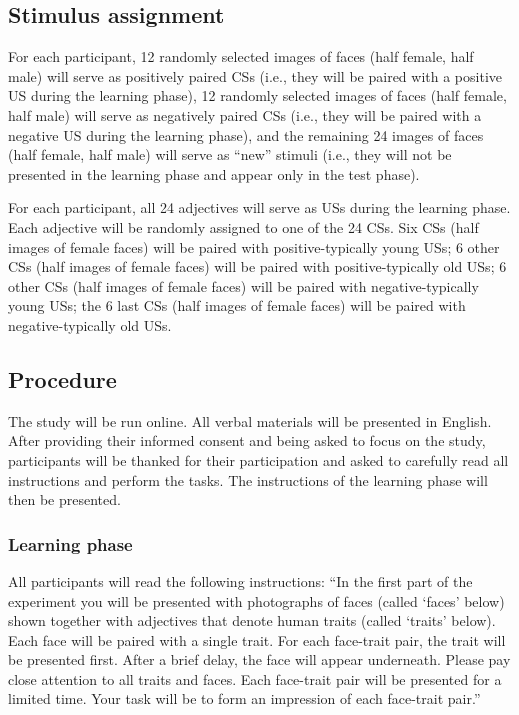 \documentclass[
  doc,floatsintext]{apa6}
\begin{document}
\subsection{Stimulus assignment}\label{stimulus-assignment}

For each participant, 12 randomly selected images of faces (half female, half male) will serve as positively paired CSs (i.e., they will be paired with a positive US during the learning phase), 12 randomly selected images of faces (half female, half male) will serve as negatively paired CSs (i.e., they will be paired with a negative US during the learning phase), and the remaining 24 images of faces (half female, half male) will serve as ``new'' stimuli (i.e., they will not be presented in the learning phase and appear only in the test phase).

For each participant, all 24 adjectives will serve as USs during the learning phase.
Each adjective will be randomly assigned to one of the 24 CSs. Six CSs (half images of female faces) will be paired with positive-typically young USs; 6 other CSs (half images of female faces) will be paired with positive-typically old USs; 6 other CSs (half images of female faces) will be paired with negative-typically young USs; the 6 last CSs (half images of female faces) will be paired with negative-typically old USs.

\subsection{Procedure}\label{procedure}

The study will be run online.
All verbal materials will be presented in English.
After providing their informed consent and being asked to focus on the study, participants will be thanked for their participation and asked to carefully read all instructions and perform the tasks. The instructions of the learning phase will then be presented.

\subsubsection{Learning phase}\label{learning-phase}

All participants will read the following instructions:
``In the first part of the experiment you will be presented with photographs of faces (called `faces' below) shown together with adjectives that denote human traits (called `traits' below).
Each face will be paired with a single trait.
For each face-trait pair, the trait will be presented first.
After a brief delay, the face will appear underneath.
Please pay close attention to all traits and faces.
Each face-trait pair will be presented for a limited time.
Your task will be to form an impression of each face-trait pair.''
\end{document}
